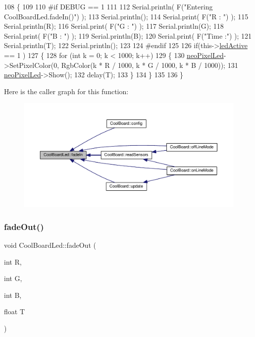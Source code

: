 \begin{DoxyCode}
108 \{
109 
110 \textcolor{preprocessor}{#if DEBUG == 1}
111 
112     Serial.println( F(\textcolor{stringliteral}{"Entering CoolBoardLed.fadeIn()"}) );
113     Serial.println();
114     Serial.print( F(\textcolor{stringliteral}{"R : "}) );
115     Serial.println(R);
116     Serial.print( F(\textcolor{stringliteral}{"G : "}) );
117     Serial.println(G);
118     Serial.print( F(\textcolor{stringliteral}{"B : "}) );
119     Serial.println(B);
120     Serial.print( F(\textcolor{stringliteral}{"Time :"}) );
121     Serial.println(T);
122     Serial.println();
123 
124 \textcolor{preprocessor}{#endif  }
125     
126     \textcolor{keywordflow}{if}(this->\hyperlink{classCoolBoardLed_a5f17c135516fcf4b44ea8a096ba0177a}{ledActive} == 1 )
127     \{
128         \textcolor{keywordflow}{for} (\textcolor{keywordtype}{int} k = 0; k < 1000; k++) 
129         \{
130             \hyperlink{classCoolBoardLed_ac2c13fa462a010cd9242bf297c013923}{neoPixelLed}->SetPixelColor(0, RgbColor(k * R / 1000, k * G / 1000, k * B / 1000));
131             \hyperlink{classCoolBoardLed_ac2c13fa462a010cd9242bf297c013923}{neoPixelLed}->Show();
132             delay(T);
133         \}
134     \}
135 
136 \}
\end{DoxyCode}
Here is the caller graph for this function\+:\nopagebreak
\begin{figure}[H]
\begin{center}
\leavevmode
\includegraphics[width=350pt]{classCoolBoardLed_ab778f5e7bed0ab74e3906d82110493c3_icgraph}
\end{center}
\end{figure}
\mbox{\label{classCoolBoardLed_a93d545679237e8cc858324367149775c}} 
\subsubsection{\texorpdfstring{fade\+Out()}{fadeOut()}}
{\footnotesize\ttfamily void Cool\+Board\+Led\+::fade\+Out (\begin{DoxyParamCaption}\item[{int}]{R,  }\item[{int}]{G,  }\item[{int}]{B,  }\item[{float}]{T }\end{DoxyParamCaption})}

